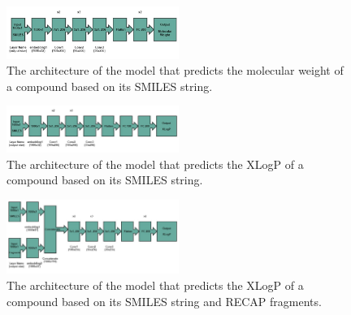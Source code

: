     \begin{figure}
        \centering
        \includegraphics[width=0.5\textwidth]{figures/MW-model_arquitecture.jpg}
        \caption{The architecture of the model that predicts the molecular weight of a compound based on its SMILES string.}
        \label{fig:mw-architecture}
    \end{figure}
    \begin{figure}
        \centering
        \includegraphics[width=0.5\textwidth]{figures/XLogP-model_arquitecture.jpg}
        \caption{The architecture of the model that predicts the XLogP of a compound based on its SMILES string.}
        \label{fig:xlogp-archi1}
    \end{figure}
    \begin{figure}
        \centering
        \includegraphics[width=0.5\textwidth]{figures/XLogP_frag_model_arquitecture.jpg}
        \caption{The architecture of the model that predicts the XLogP of a compound based on its SMILES string and RECAP fragments.}
        \label{fig:xlogp-archi2}
    \end{figure}
